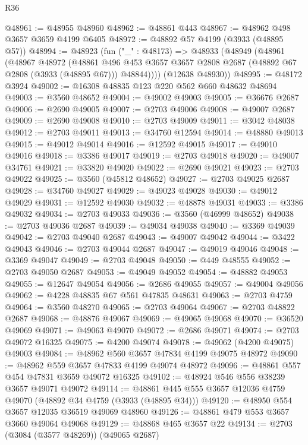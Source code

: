 \begin{lexlean}{R36}
\begin{coremodule}
@48961 := @48955 @48960
@48962 := @48861 @443
@48967 := @48962 @498 @3657 @3659 @4199 @6405
@48972 := @48892 @57 @4199 (@3933 (@48895 @57))
@48994 := @48923
    (fun ("_" : @48173) =>
    @48933
      (@48949
        (@48961
          (@48967
            @48972
            (@48861
              @496
              @453
              @3657
              @3657
              @2808
              @2687
              (@48892 @67 @2808 (@3933 (@48895 @67)))
              @48844))))
      (@12638 @48930))
@48995 := @48172 @3924
@49002 := @16308 @48835 @123 @220 @562 @660 @48632 @48694
@49003 := @3560 @48652
@49004 := @49002 @49003
@49005 := @36676 @2687
@49006 := @2690 @49005
@49007 := @2703 @49006
@49008 := @49007 @2687
@49009 := @2690 @49008
@49010 := @2703 @49009
@49011 := @3042 @48038
@49012 := @2703 @49011
@49013 := @34760 @12594
@49014 := @48880 @49013
@49015 := @49012 @49014
@49016 := @12592 @49015
@49017 := @49010 @49016
@49018 := @3386 @49017
@49019 := @2703 @49018
@49020 := @49007 @34761
@49021 := @33820 @49020
@49022 := @2690 @49021
@49023 := @2703 @49022
@49025 := @3560 (@45812 @48652)
@49027 := @2703 @49025 @2687
@49028 := @34760 @49027
@49029 := @49023 @49028
@49030 := @49012 @49029
@49031 := @12592 @49030
@49032 := @48878 @49031
@49033 := @3386 @49032
@49034 := @2703 @49033
@49036 := @3560 (@46999 @48652)
@49038 := @2703 @49036 @2687
@49039 := @49034 @49038
@49040 := @3369 @49039
@49042 := @2703 @49040 @2687
@49043 := @49007 @49042
@49044 := @3422 @49043
@49046 := @2703 @49044 @2687
@49047 := @49019 @49046
@49048 := @3369 @49047
@49049 := @2703 @49048
@49050 := @449 @48555
@49052 := @2703 @49050 @2687
@49053 := @49049 @49052
@49054 := @48882 @49053
@49055 := @12647 @49054
@49056 := @2686 @49055
@49057 := @49004 @49056
@49062 := @4228 @48835 @67 @561 @47835 @48631
@49063 := @2703 @4759
@49064 := @3560 @48270
@49065 := @2703 @49064
@49067 := @2703 @48822 @2687
@49068 := @48876 @49067
@49069 := @49065 @49068
@49070 := @36520 @49069
@49071 := @49063 @49070
@49072 := @2686 @49071
@49074 := @2703 @49072 @16325
@49075 := @4200 @49074
@49078 := @49062 (@4200 @49075) @49003
@49084 := @48962 @560 @3657 @47834 @4199 @49075 @48972
@49090 := @48962 @559 @3657 @47833 @4199 @49074 @48972
@49096 := @48861 @557 @454 @47831 @3659 @49072 @16325
@49102 := @48924 @546 @556 @38239 @3657 @49071 @49072
@49114 := @48861 @445 @555 @3657 @12036 @4759 @49070 (@48892 @34 @4759 (@3933 (@48895 @34)))
@49120 := @48950 @554 @3657 @12035 @36519 @49069 @48960
@49126 := @48861 @479 @553 @3657 @3660 @49064 @49068
@49129 := @48868 @465 @3657 @22
@49134 := @2703 (@3084 (@3577 @48269)) (@49065 @2687)

\end{coremodule}
\end{lexlean}
